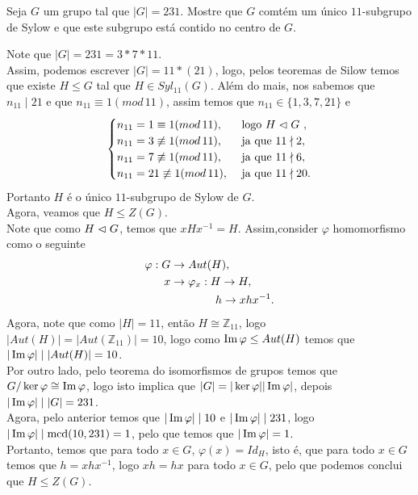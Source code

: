 \begin{homeworkProblem}[11]
  Seja $G$ um grupo tal que $|G|=231$. Mostre que $G$ comtém um único $11$-subgrupo de Sylow e que este subgrupo está contido no centro de $G$. 
  \begin{solution}
    Note que $|G|=231=3*7*11$.\\
    Assim, podemos escrever $|G|=11*(21)$, logo, pelos teoremas de Silow temos que existe $H\leq G$ tal que $H\in Syl_{11}(G)$. Além do  mais, nos sabemos que $n_{11}\mid 21$ e que $n_{11}\equiv 1(mod\,11)$, assim temos que $n_{11}\in\{1,3,7,21\}$ e 
    \begin{align*}
      \begin{cases}
        n_{11}=1\equiv 1(mod\,11), &\text{ logo $H\vartriangleleft G$ }\text{,} \\
        n_{11}=3\not\equiv 1(mod\,11), &\text{ ja que } 11\nmid 2,\\
        n_{11}=7\not\equiv 1(mod\,11), &\text{ ja que } 11\nmid 6,\\
        n_{11}=21\not\equiv 1(mod\,11), &\text{ ja que } 11\nmid 20.
      \end{cases}
    \end{align*}
    Portanto $H$ é o único $11$-subgrupo de Sylow de $G$.\\

    Agora, veamos que $H\leq Z(G)$.\\
    Note que como $H\vartriangleleft G$, temos que $xHx^{-1}=H$. Assim,consider $\varphi$ homomorfismo como o seguinte
    \begin{align*}
      \varphi:G&\to Aut(H),\\
              x&\to\varphi_x:H\to H,\\
                          &\hspace{1.4cm}h\to xhx^{-1}.
    \end{align*}
    Agora, note que como $|H|=11$, então $H\cong \mathbb{Z}_{11}$, logo $|Aut(H)|=|Aut(\mathbb{Z}_{11})|=10$, logo como $\operatorname{Im} \varphi\leq Aut(H)$ temos que $|\operatorname{Im} \varphi|\mid |Aut(H)|=10$.\\
    Por outro lado, pelo teorema do isomorfismos de grupos temos que $G/\ker \varphi\cong \operatorname{Im} \varphi$, logo isto implica que $|G|=|\ker \varphi||\operatorname{Im} \varphi|$, depois $|\operatorname{Im} \varphi|\mid |G|=231$.\\
    Agora, pelo anterior temos que $|\operatorname{Im}\varphi|\mid 10$ e $|\operatorname{Im}\varphi|\mid 231$, logo $|\operatorname{Im}\varphi|\mid \operatorname{mcd}(10,231)=1$, pelo que temos que $|\operatorname{Im}\varphi|=1$.\\
    Portanto, temos que para todo $x\in G$, $\varphi(x)=Id_{H}$, isto é, que para todo $x\in G$ temos que $h=xhx^{-1}$, logo $xh=hx$ para todo $x\in G$, pelo que podemos conclui que $H\leq Z(G)$. 
  \end{solution}
\end{homeworkProblem}
